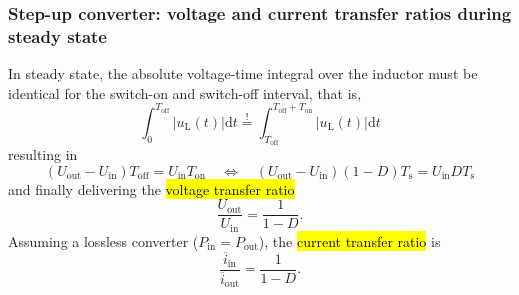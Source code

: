 \begin{frame}
    \frametitle{Step-up converter: voltage and current transfer ratios during steady state}
    In steady state, the absolute voltage-time integral over the inductor must be identical for the switch-on and switch-off interval, that is,
    \begin{equation}
        \int_{0}^{T_\mathrm{off}} \left|u_\mathrm{L}(t)\right| \mathrm{d}t \stackrel{!}{=} \int_{T_\mathrm{off}}^{T_\mathrm{off}+T_\mathrm{on}} \left|u_\mathrm{L}(t)\right| \mathrm{d}t
    \end{equation}
    resulting in
    \begin{equation}
            (U_\mathrm{out}-U_\mathrm{in})T_\mathrm{off} = U_\mathrm{in}T_\mathrm{on} \quad  \Leftrightarrow \quad  (U_\mathrm{out}-U_\mathrm{in})(1-D)T_\mathrm{s} = U_\mathrm{in}DT_\mathrm{s}
    \end{equation}
    and finally delivering the \hl{voltage transfer ratio}
    \begin{equation}
        \frac{U_\mathrm{out}}{U_\mathrm{in}} = \frac{1}{1-D}.
    \end{equation}
    Assuming a lossless converter ($P_\mathrm{in}=P_\mathrm{out}$), the \hl{current transfer ratio} is 
    \begin{equation}
        \frac{\overline{i}_\mathrm{in}}{\overline{i}_\mathrm{out}} = \frac{1}{1-D}.
    \end{equation}
\end{frame}


